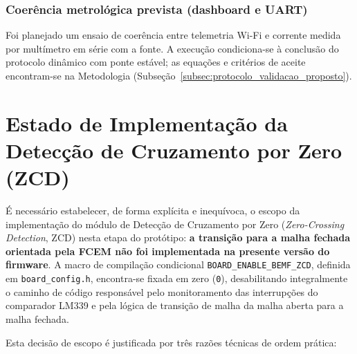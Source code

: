 \subsubsection{Coerência metrológica prevista (dashboard e UART)}

Foi planejado um ensaio de coerência entre telemetria Wi-Fi e corrente medida por multímetro em série com a fonte. A execução condiciona-se à conclusão do protocolo dinâmico com ponte estável; as equações e critérios de aceite encontram-se na Metodologia (Subseção~\ref{subsec:protocolo_validacao_proposto}).

\section{Estado de Implementação da Detecção de Cruzamento por Zero (ZCD)}

É necessário estabelecer, de forma explícita e inequívoca, o escopo da implementação do módulo de Detecção de Cruzamento por Zero (\textit{Zero-Crossing Detection}, ZCD) nesta etapa do protótipo: \textbf{a transição para a malha fechada orientada pela FCEM não foi implementada na presente versão do firmware}. A macro de compilação condicional \texttt{BOARD\_ENABLE\_BEMF\_ZCD}, definida em \texttt{board\_config.h}, encontra-se fixada em zero (\texttt{0}), desabilitando integralmente o caminho de código responsável pelo monitoramento das interrupções do comparador LM339 e pela lógica de transição de malha da malha aberta para a malha fechada.

Esta decisão de escopo é justificada por três razões técnicas de ordem prática:

